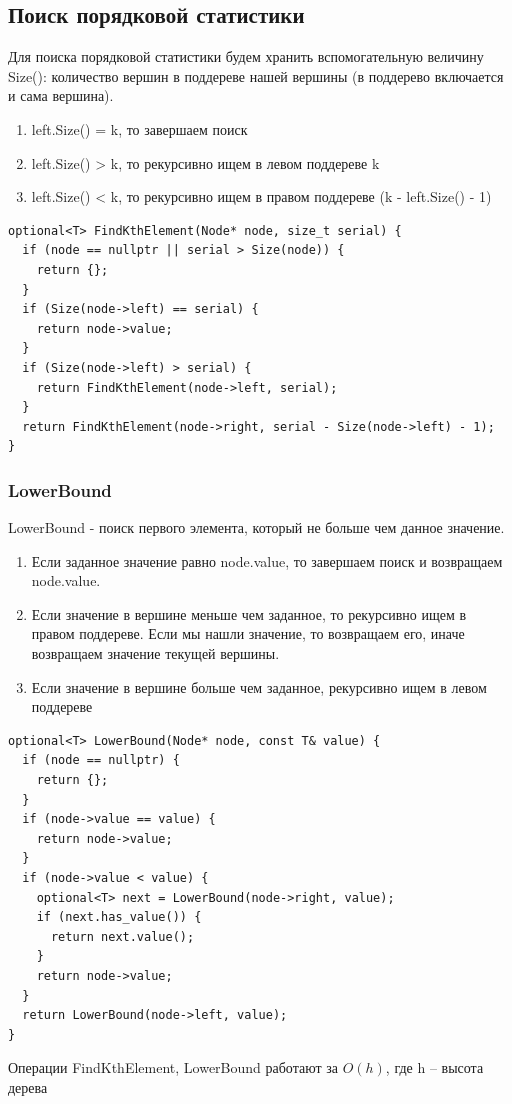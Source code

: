 \subsection*{Поиск порядковой статистики}

\Alg

Для поиска порядковой статистики будем хранить вспомогательную величину Size(): количество вершин в поддереве нашей вершины (в поддерево включается и сама вершина).

\begin{enumerate}
    \item left.Size() = k, то завершаем поиск
    \item left.Size() > k, то рекурсивно ищем в левом поддереве k
    \item left.Size() < k, то рекурсивно ищем в правом поддереве (k - left.Size() - 1)
\end{enumerate}

\begin{lstlisting}
optional<T> FindKthElement(Node* node, size_t serial) {
  if (node == nullptr || serial > Size(node)) {
    return {};
  }
  if (Size(node->left) == serial) {
    return node->value;
  }
  if (Size(node->left) > serial) {
    return FindKthElement(node->left, serial);
  }
  return FindKthElement(node->right, serial - Size(node->left) - 1);
}
\end{lstlisting}

\subsubsection*{LowerBound}

\Def LowerBound - поиск первого элемента, который не больше чем данное значение.

\Alg

\begin{enumerate}
    \item Если заданное значение равно node.value, то завершаем поиск и возвращаем node.value.
    \item Если значение в вершине меньше чем заданное, то рекурсивно ищем в правом поддереве. Если мы нашли значение, то возвращаем его, иначе возвращаем значение текущей вершины.
    \item Если значение в вершине больше чем заданное, рекурсивно ищем в левом поддереве
\end{enumerate}

\begin{lstlisting}
optional<T> LowerBound(Node* node, const T& value) {
  if (node == nullptr) {
    return {};
  }
  if (node->value == value) {
    return node->value;
  }
  if (node->value < value) {
    optional<T> next = LowerBound(node->right, value);
    if (next.has_value()) {
      return next.value();
    }
    return node->value;
  }
  return LowerBound(node->left, value);
}
\end{lstlisting}

\Statement Операции FindKthElement, LowerBound работают за $O(h)$, где h -- высота дерева

\pagebreak